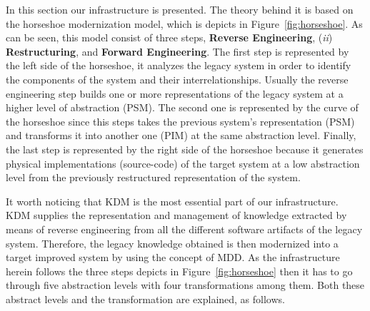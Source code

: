 In this section our infrastructure is presented. The theory behind it is based on the horseshoe modernization model, which is depicts in Figure~\ref{fig:horseshoe}. As can be seen, this model consist of three steps, \textbf{Reverse Engineering}, (\textit{ii}) \textbf{Restructuring}, and \textbf{Forward Engineering}. The first step is represented by the left side of the horseshoe, it analyzes the legacy system in order to identify the components of the system and their interrelationships. Usually the reverse engineering step builds one or more representations of the legacy system at a higher level of abstraction (PSM). The second one is represented by the curve of the horseshoe since this steps takes the previous system's representation (PSM) and transforms it into another one (PIM) at the same abstraction level. Finally, the last step is represented by the right side of the horseshoe because it generates physical implementations (source-code) of the target system at a low abstraction level from the previously restructured representation of the system.

It worth noticing that KDM is the most essential part of our infrastructure. KDM supplies the representation and management of knowledge extracted by means of reverse engineering from all the different software artifacts of the legacy system. Therefore, the legacy knowledge obtained is then modernized into a target improved system by using the concept of MDD. As the infrastructure herein follows the three steps depicts in Figure~\ref{fig:horseshoe} then it has to go through five abstraction levels with four transformations among them. Both these abstract levels and the transformation are explained, as follows.



